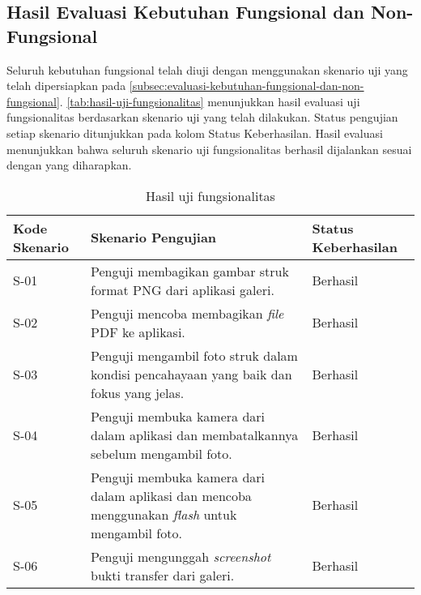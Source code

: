 \subsection{Hasil Evaluasi Kebutuhan Fungsional dan Non-Fungsional}
\label{subsec:hasil-evaluasi-kebutuhan-fungsional-dan-non-fungsional}

Seluruh kebutuhan fungsional telah diuji dengan menggunakan skenario uji yang telah dipersiapkan pada \autoref{subsec:evaluasi-kebutuhan-fungsional-dan-non-fungsional}. \autoref{tab:hasil-uji-fungsionalitas} menunjukkan hasil evaluasi uji fungsionalitas berdasarkan skenario uji yang telah dilakukan. Status pengujian setiap skenario ditunjukkan pada kolom Status Keberhasilan. Hasil evaluasi menunjukkan bahwa seluruh skenario uji fungsionalitas berhasil dijalankan sesuai dengan yang diharapkan.

\begin{table}[h!]
\caption{Hasil uji fungsionalitas}
\label{tab:hasil-uji-fungsionalitas}
\begin{tabularx}{\linewidth}{|p{2cm}|X|p{2.5cm}|}
\hline
\textbf{Kode Skenario} & \textbf{Skenario Pengujian} & \textbf{Status Keberhasilan} \\
\hline
S-01 & Penguji membagikan gambar struk format PNG dari aplikasi galeri. & Berhasil \\
\hline
S-02 & Penguji mencoba membagikan \emph{file} PDF ke aplikasi. & Berhasil \\
\hline
S-03 & Penguji mengambil foto struk dalam kondisi pencahayaan yang baik dan fokus yang jelas. & Berhasil \\
\hline
S-04 & Penguji membuka kamera dari dalam aplikasi dan membatalkannya sebelum mengambil foto. & Berhasil \\
\hline
S-05 & Penguji membuka kamera dari dalam aplikasi dan mencoba menggunakan \emph{flash} untuk mengambil foto. & Berhasil \\
\hline
S-06 & Penguji mengunggah \emph{screenshot} bukti transfer dari galeri. & Berhasil \\
\hline
\end{tabularx}
\end{table}

